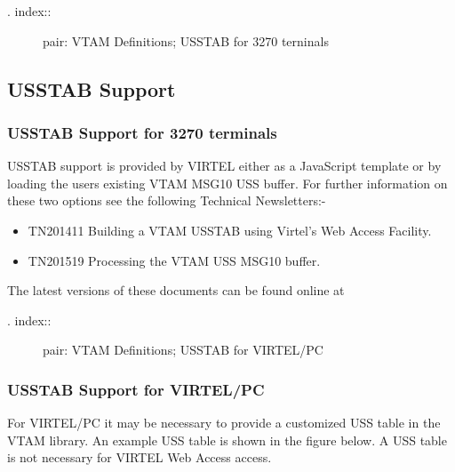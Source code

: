 \documentclass[letterpaper,10pt,english]{sphinxmanual}
\begin{document}
\begin{description}
\item[{. index::}] \leavevmode
pair: VTAM Definitions; USSTAB for 3270 terninals

\end{description}


\subsection{USSTAB Support}
\label{\detokenize{Installation_Guide:usstab-support}}

\subsubsection{USSTAB Support for 3270 terminals}
\label{\detokenize{Installation_Guide:usstab-support-for-3270-terminals}}
USSTAB support is provided by VIRTEL either as a JavaScript template or by loading the users existing VTAM MSG10 USS buffer. For further information on these two options see the following Technical Newsletters:-
\begin{itemize}
\item {} 
TN201411 Building a VTAM USSTAB using Virtel’s Web Access Facility.

\item {} 
TN201519 Processing the VTAM USS MSG10 buffer.

\end{itemize}

The latest versions of these documents can be found online at 
\begin{description}
\item[{. index::}] \leavevmode
pair: VTAM Definitions; USSTAB for VIRTEL/PC

\end{description}


\subsubsection{USSTAB Support for VIRTEL/PC}
\label{\detokenize{Installation_Guide:usstab-support-for-virtel-pc}}
For VIRTEL/PC it may be necessary to provide a customized USS table in the VTAM library. An example USS table is shown in the figure below. A USS table is not necessary for VIRTEL Web Access access.
\end{document}
